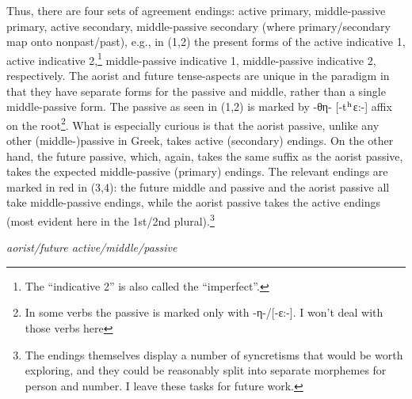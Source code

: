 \documentclass[]{ling-200b-2}
\newcommand*{\textsup}[1]{\ensuremath{^\textrm{{\scriptsize #1}}}}
\begin{document}
\normalsize
\noindent \hfill \par
\noindent \hfill \par
Thus, there are four sets of agreement endings: active primary, middle-passive primary, active secondary, middle-passive secondary (where primary/secondary map onto nonpast/past), e.g., in (1,2) the present forms of the active indicative 1, active indicative 2,\footnote{The ``indicative 2'' is also called the ``imperfect''.} middle-passive indicative 1, middle-passive indicative 2, respectively. The aorist and future tense-aspects are unique in the paradigm in that they have separate forms for the passive and middle,  rather than a single middle-passive form. The passive as seen in (1,2) is marked by -θη- [-t\textsup{h}ε:-] affix on the root\footnote{ In some verbs the passive is marked only with -η-/[-ε:-]. I won't deal with those verbs here}. What is especially curious is that the aorist passive, unlike any other (middle-)passive in Greek, takes active (secondary) endings. On the other hand, the future passive, which, again, takes the same suffix as the aorist passive, takes the expected middle-passive (primary) endings. The relevant endings are marked in red in (3,4): the future middle and passive and the aorist passive all take middle-passive endings, while the aorist passive takes the active endings (most evident here in the 1st/2nd plural).\footnote{The endings themselves display a number of syncretisms that would be worth exploring, and they could be reasonably split into separate morphemes for person and number. I leave these tasks for future work.}

\noindent \hfill \par
\ex \textit{aorist/future active/middle/passive }
\xe
\end{document}
